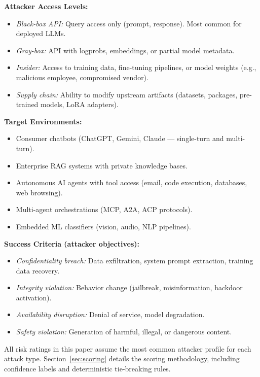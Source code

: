 \documentclass[conference]{IEEEtran}
\begin{document}
\begin{tcolorbox}[threatbox, title={Threat Model \& Assumptions}]
\textbf{Attacker Access Levels:}
\begin{itemize}[leftmargin=*, nosep]
  \item \textit{Black-box API:} Query access only (prompt, response). Most common for deployed LLMs.
  \item \textit{Gray-box:} API with logprobs, embeddings, or partial model metadata.
  \item \textit{Insider:} Access to training data, fine-tuning pipelines, or model weights (e.g., malicious employee, compromised vendor).
  \item \textit{Supply chain:} Ability to modify upstream artifacts (datasets, packages, pre-trained models, LoRA adapters).
\end{itemize}

\textbf{Target Environments:}
\begin{itemize}[leftmargin=*, nosep]
  \item Consumer chatbots (ChatGPT, Gemini, Claude --- single-turn and multi-turn).
  \item Enterprise RAG systems with private knowledge bases.
  \item Autonomous AI agents with tool access (email, code execution, databases, web browsing).
  \item Multi-agent orchestrations (MCP, A2A, ACP protocols).
  \item Embedded ML classifiers (vision, audio, NLP pipelines).
\end{itemize}

\textbf{Success Criteria (attacker objectives):}
\begin{itemize}[leftmargin=*, nosep]
  \item \textit{Confidentiality breach:} Data exfiltration, system prompt extraction, training data recovery.
  \item \textit{Integrity violation:} Behavior change (jailbreak, misinformation, backdoor activation).
  \item \textit{Availability disruption:} Denial of service, model degradation.
  \item \textit{Safety violation:} Generation of harmful, illegal, or dangerous content.
\end{itemize}
\end{tcolorbox}

All risk ratings in this paper assume the most common attacker profile for each attack type. Section~\ref{sec:scoring} details the scoring methodology, including confidence labels and deterministic tie-breaking rules.
\end{document}
